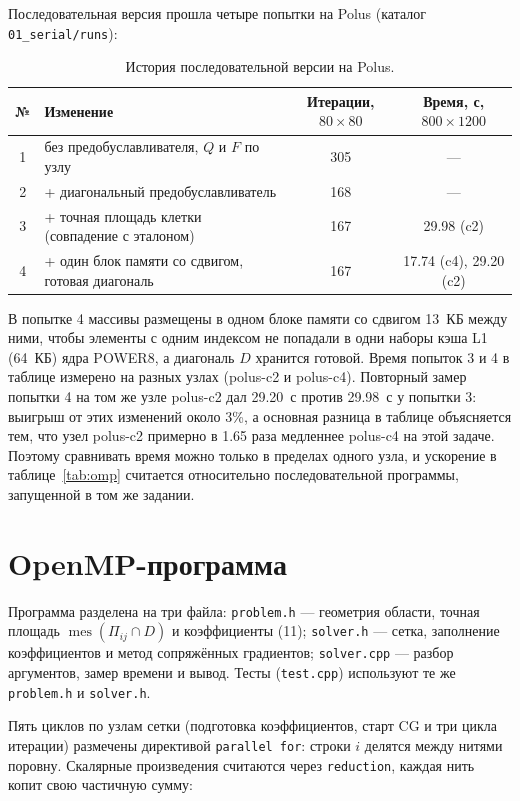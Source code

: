 \documentclass[11pt,a4paper]{article}
\begin{document}
Последовательная версия прошла четыре попытки на Polus (каталог \texttt{01\_serial/runs}):

\begin{table}[htbp]
\centering\small
\caption{История последовательной версии на Polus.}
\begin{tabular}{@{}cp{8.2cm}cc@{}}
\toprule
№ & Изменение & Итерации, $80\times80$ & Время, с, $800\times1200$ \\
\midrule
1 & без предобуславливателя, $Q$ и $F$ по узлу & 305 & — \\
2 & + диагональный предобуславливатель & 168 & — \\
3 & + точная площадь клетки (совпадение с эталоном) & 167 & 29.98 (c2) \\
4 & + один блок памяти со сдвигом, готовая диагональ & 167 & 17.74 (c4), 29.20 (c2) \\
\bottomrule
\end{tabular}
\end{table}

В попытке 4 массивы размещены в одном блоке памяти со сдвигом 13~КБ между ними, чтобы элементы
с одним индексом не попадали в одни наборы кэша L1 (64~КБ) ядра POWER8, а диагональ $D$ хранится
готовой. Время попыток 3 и 4 в таблице измерено на разных узлах (polus-c2 и polus-c4). Повторный
замер попытки 4 на том же узле polus-c2 дал 29.20~с против 29.98~с у попытки 3: выигрыш от этих
изменений около 3\%, а основная разница в таблице объясняется тем, что узел polus-c2 примерно
в 1.65 раза медленнее polus-c4 на этой задаче. Поэтому сравнивать время можно только в пределах
одного узла, и ускорение в таблице~\ref{tab:omp} считается относительно последовательной
программы, запущенной в том же задании.

\section{OpenMP-программа}

Программа разделена на три файла: \texttt{problem.h} — геометрия области, точная площадь
$\operatorname{mes}(\Pi_{ij}\cap D)$ и коэффициенты (11); \texttt{solver.h} — сетка, заполнение
коэффициентов и метод сопряжённых градиентов; \texttt{solver.cpp} — разбор аргументов, замер
времени и вывод. Тесты (\texttt{test.cpp}) используют те же \texttt{problem.h} и \texttt{solver.h}.

Пять циклов по узлам сетки (подготовка коэффициентов, старт CG и три цикла итерации) размечены
директивой \texttt{parallel for}: строки $i$ делятся между нитями поровну. Скалярные произведения
считаются через \texttt{reduction}, каждая нить копит свою частичную сумму:
\end{document}
